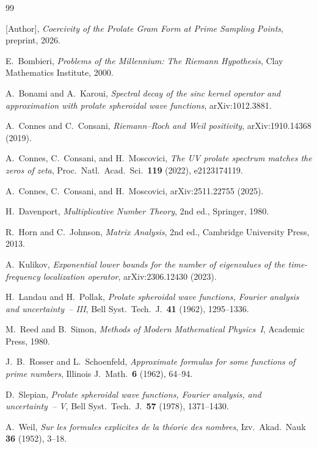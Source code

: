 \documentclass[12pt,a4paper]{amsart}
\theoremstyle{definition}
\begin{document}
\begin{thebibliography}{99}

[Author],
\emph{Coercivity of the Prolate Gram Form at Prime Sampling Points},
preprint, 2026.

E.~Bombieri,
\textit{Problems of the Millennium: The Riemann Hypothesis},
Clay Mathematics Institute, 2000.

A.~Bonami and A.~Karoui,
\textit{Spectral decay of the sinc kernel operator and approximation
with prolate spheroidal wave functions},
arXiv:1012.3881.

A.~Connes and C.~Consani,
\textit{Riemann--Roch and Weil positivity},
arXiv:1910.14368 (2019).

A.~Connes, C.~Consani, and H.~Moscovici,
\textit{The UV prolate spectrum matches the zeros of zeta},
Proc.\ Natl.\ Acad.\ Sci.\ \textbf{119} (2022), e2123174119.

A.~Connes, C.~Consani, and H.~Moscovici,
arXiv:2511.22755 (2025).

H.~Davenport,
\textit{Multiplicative Number Theory}, 2nd ed.,
Springer, 1980.

R.~Horn and C.~Johnson,
\textit{Matrix Analysis}, 2nd ed.,
Cambridge University Press, 2013.

A.~Kulikov,
\textit{Exponential lower bounds for the number of eigenvalues
of the time-frequency localization operator},
arXiv:2306.12430 (2023).

H.~Landau and H.~Pollak,
\textit{Prolate spheroidal wave functions, Fourier analysis
and uncertainty~-- III},
Bell Syst.\ Tech.\ J.\ \textbf{41} (1962), 1295--1336.

M.~Reed and B.~Simon,
\textit{Methods of Modern Mathematical Physics~I},
Academic Press, 1980.

J.~B.~Rosser and L.~Schoenfeld,
\textit{Approximate formulas for some functions of prime numbers},
Illinois J.\ Math.\ \textbf{6} (1962), 64--94.

D.~Slepian,
\textit{Prolate spheroidal wave functions, Fourier analysis,
and uncertainty~-- V},
Bell Syst.\ Tech.\ J.\ \textbf{57} (1978), 1371--1430.

A.~Weil,
\textit{Sur les formules explicites de la th\'{e}orie des nombres},
Izv.\ Akad.\ Nauk \textbf{36} (1952), 3--18.

\end{thebibliography}
\end{document}
